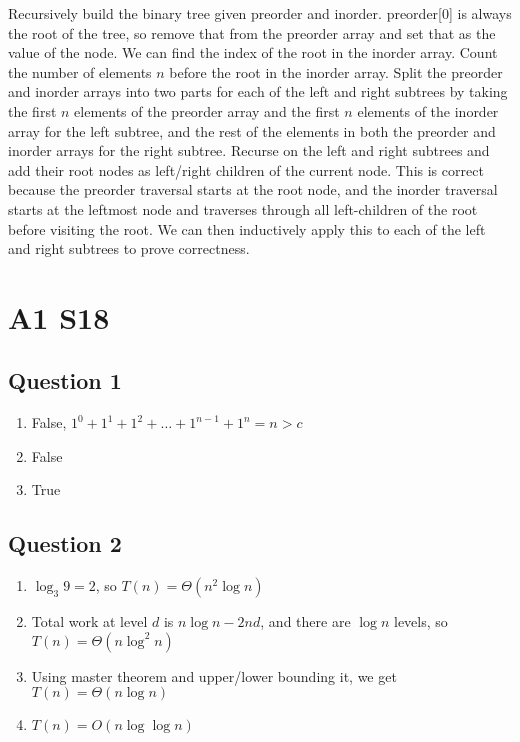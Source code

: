 \documentclass[11pt]{article}
\begin{document}
Recursively build the binary tree given preorder and inorder. preorder[0] is always the root of the tree, so remove that from the preorder array and set that as the value of the node. We can find the index of the root in the inorder array. Count the number of elements $n$ before the root in the inorder array. Split the preorder and inorder arrays into two parts for each of the left and right subtrees by taking the first $n$ elements of the preorder array and the first $n$ elements of the inorder array for the left subtree, and the rest of the elements in both the preorder and inorder arrays for the right subtree. Recurse on the left and right subtrees and add their root nodes as left/right children of the current node. This is correct because the preorder traversal starts at the root node, and the inorder traversal starts at the leftmost node and traverses through all left-children of the root before visiting the root. We can then inductively apply this to each of the left and right subtrees to prove correctness.

\section{A1 S18}

\subsection{Question 1}

\begin{enumerate}
    \item False, $1^0 + 1^1 + 1^2 + \dots + 1^{n-1} + 1^n = n > c$
    \item False
    \item True
\end{enumerate}

\subsection{Question 2}

\begin{enumerate}
    \item $\log_3 9 = 2$, so $T(n) = \Theta(n^2 \log n)$
    \item Total work at level $d$ is $n \log n - 2nd$, and there are $\log n$ levels, so $T(n) = \Theta(n \log^2 n)$
    \item Using master theorem and upper/lower bounding it, we get $T(n) = \Theta(n \log n)$
    \item $T(n) = O(n \log \log n)$
\end{enumerate}
\end{document}
